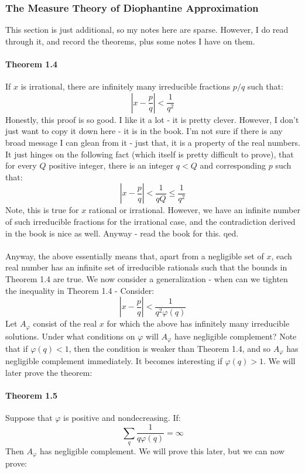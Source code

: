 \documentclass[12pt,a4paper]{article}
\newcommand{\1}[1]{\mathbbm{1}\left\{ #1 \right\}}
\begin{document}
\subsubsection{The Measure Theory of Diophantine Approximation}
This section is just additional, so my notes here are sparse. However, I do read through it, and record the theorems, plus some notes I have on them.

\paragraph{Theorem 1.4} If $x$ is irrational, there are infinitely many irreducible fractions $p/q$ such that:
$$
	\left|x - \frac{p}{q}\right| < \frac{1}{q^2}
$$
Honestly, this proof is so good. I like it a lot - it is pretty clever. However, I don't just want to copy it down here - it is in the book. I'm not sure if there is any broad message I can glean from it - just that, it is a property of the real numbers. It just hinges on the following fact (which itself is pretty difficult to prove), that for every $Q$ positive integer, there is an integer $q < Q$ and corresponding $p$ such that:
$$
	\left|x - \frac{p}{q} \right| < \frac{1}{q Q} \leq \frac{1}{q^2}
$$
Note, this is true for $x$ rational or irrational. However, we have an infinite number of such irreducible fractions for the irrational case, and the contradiction derived in the book is nice as well. Anyway - read the book for this. qed.
\\\\
Anyway, the above essentially means that, apart from a negligible set of $x$, each real number has an infinite set of irreducible rationals such that the bounds in Theorem 1.4 are true. We now consider a generalization - when can we tighten the inequality in Theorem 1.4 - Consider:
$$
	\left|x - \frac{p}{q}\right| < \frac{1}{q^2\varphi(q)}
$$
Let $A_\varphi$ consist of the real $x$ for which the above has infinitely many irreducible solutions. Under what conditions on $\varphi$ will $A_\varphi$ have negligible complement? Note that if $\varphi(q) < 1$, then the condition is weaker than Theorem 1.4, and so $A_\varphi$ has negligible complement immediately. It becomes interesting if $\varphi(q) > 1$. We will later prove the theorem:

\paragraph{Theorem 1.5} Suppose that $\varphi$ is positive and nondecreasing. If:
$$
	\sum_q \frac{1}{q\varphi(q)} = \infty
$$
Then $A_\varphi$ has negligible complement. We will prove this later, but we can now prove:
\end{document}
